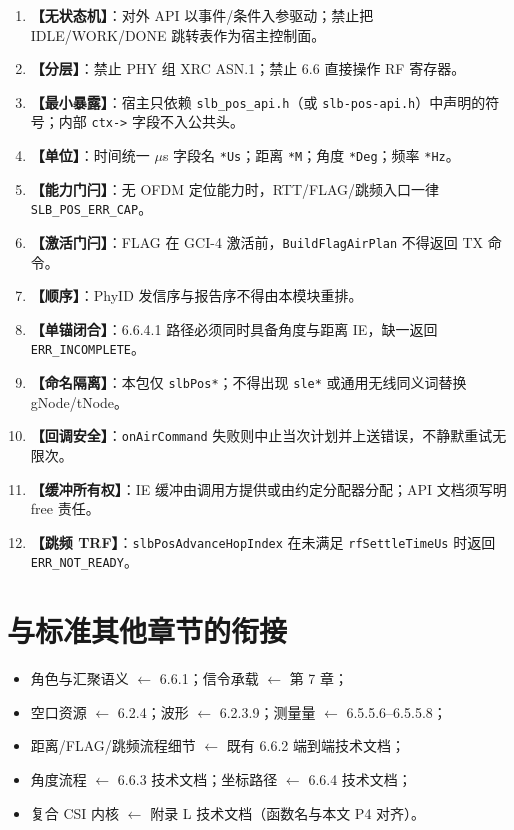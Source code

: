 \documentclass[11pt,a4paper]{ctexart}
\begin{document}
\begin{enumerate}[nosep]
  \item \textbf{【无状态机】}：对外 API 以事件/条件入参驱动；禁止把 IDLE/WORK/DONE 跳转表作为宿主控制面。
  \item \textbf{【分层】}：禁止 PHY 组 XRC ASN.1；禁止 6.6 直接操作 RF 寄存器。
  \item \textbf{【最小暴露】}：宿主只依赖 \texttt{slb\_pos\_api.h}（或 \texttt{slb-pos-api.h}）中声明的符号；内部 \texttt{ctx->} 字段不入公共头。
  \item \textbf{【单位】}：时间统一 $\mu$s 字段名 \texttt{*Us}；距离 \texttt{*M}；角度 \texttt{*Deg}；频率 \texttt{*Hz}。
  \item \textbf{【能力门闩】}：无 OFDM 定位能力时，RTT/FLAG/跳频入口一律 \texttt{SLB\_POS\_ERR\_CAP}。
  \item \textbf{【激活门闩】}：FLAG 在 GCI-4 激活前，\texttt{BuildFlagAirPlan} 不得返回 TX 命令。
  \item \textbf{【顺序】}：PhyID 发信序与报告序不得由本模块重排。
  \item \textbf{【单锚闭合】}：6.6.4.1 路径必须同时具备角度与距离 IE，缺一返回 \texttt{ERR\_INCOMPLETE}。
  \item \textbf{【命名隔离】}：本包仅 \texttt{slbPos*}；不得出现 \texttt{sle*} 或通用无线同义词替换 gNode/tNode。
  \item \textbf{【回调安全】}：\texttt{onAirCommand} 失败则中止当次计划并上送错误，不静默重试无限次。
  \item \textbf{【缓冲所有权】}：IE 缓冲由调用方提供或由约定分配器分配；API 文档须写明 free 责任。
  \item \textbf{【跳频 TRF】}：\texttt{slbPosAdvanceHopIndex} 在未满足 \texttt{rfSettleTimeUs} 时返回 \texttt{ERR\_NOT\_READY}。
\end{enumerate}

\section{与标准其他章节的衔接}

\begin{itemize}[nosep]
  \item 角色与汇聚语义 $\leftarrow$ 6.6.1；信令承载 $\leftarrow$ 第 7 章；
  \item 空口资源 $\leftarrow$ 6.2.4；波形 $\leftarrow$ 6.2.3.9；测量量 $\leftarrow$ 6.5.5.6--6.5.5.8；
  \item 距离/FLAG/跳频流程细节 $\leftarrow$ 既有 6.6.2 端到端技术文档；
  \item 角度流程 $\leftarrow$ 6.6.3 技术文档；坐标路径 $\leftarrow$ 6.6.4 技术文档；
  \item 复合 CSI 内核 $\leftarrow$ 附录 L 技术文档（函数名与本文 P4 对齐）。
\end{itemize}
\end{document}
